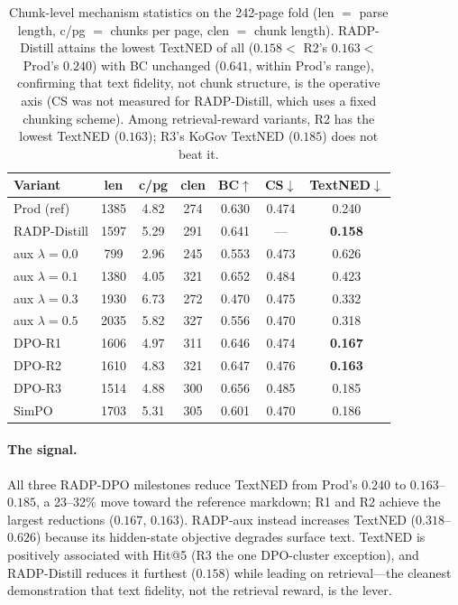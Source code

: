 \documentclass[11pt]{article}
\begin{document}
\begin{table}[t]
\centering\small
\setlength{\tabcolsep}{3.5pt}
\begin{tabular}{lcccccc}
\toprule
Variant & len & c/pg & clen & BC$\uparrow$ & CS$\downarrow$ & TextNED$\downarrow$ \\
\midrule
Prod (ref) & 1385 & 4.82 & 274 & 0.630 & 0.474 & 0.240 \\
RADP-Distill & 1597 & 5.29 & 291 & 0.641 & --- & \textbf{0.158} \\
aux $\lambda{=}0.0$ & 799 & 2.96 & 245 & 0.553 & 0.473 & 0.626 \\
aux $\lambda{=}0.1$ & 1380 & 4.05 & 321 & 0.652 & 0.484 & 0.423 \\
aux $\lambda{=}0.3$ & 1930 & 6.73 & 272 & 0.470 & 0.475 & 0.332 \\
aux $\lambda{=}0.5$ & 2035 & 5.82 & 327 & 0.556 & 0.470 & 0.318 \\
DPO-R1 & 1606 & 4.97 & 311 & 0.646 & 0.474 & \textbf{0.167} \\
DPO-R2 & 1610 & 4.83 & 321 & 0.647 & 0.476 & \textbf{0.163} \\
DPO-R3 & 1514 & 4.88 & 300 & 0.656 & 0.485 & 0.185 \\
SimPO & 1703 & 5.31 & 305 & 0.601 & 0.470 & 0.186 \\
\bottomrule
\end{tabular}
\caption{Chunk-level mechanism statistics on the 242-page fold (len $=$ parse length, c/pg $=$ chunks per page, clen $=$ chunk length). RADP-Distill attains the lowest TextNED of all ($0.158 <$ R2's $0.163 <$ Prod's $0.240$) with BC unchanged ($0.641$, within Prod's range), confirming that text fidelity, not chunk structure, is the operative axis (CS was not measured for RADP-Distill, which uses a fixed chunking scheme). Among retrieval-reward variants, R2 has the lowest TextNED ($0.163$); R3's KoGov TextNED ($0.185$) does not beat it.}
\label{tab:mechanism}
\end{table}

\paragraph{The signal.} All three RADP-DPO milestones reduce TextNED from Prod's $0.240$ to $0.163$--$0.185$, a 23--32\% move toward the reference markdown; R1 and R2 achieve the largest reductions ($0.167$, $0.163$). RADP-aux instead increases TextNED ($0.318$--$0.626$) because its hidden-state objective degrades surface text. TextNED is positively associated with Hit@5 (R3 the one DPO-cluster exception), and RADP-Distill reduces it furthest ($0.158$) while leading on retrieval---the cleanest demonstration that text fidelity, not the retrieval reward, is the lever.
\end{document}

